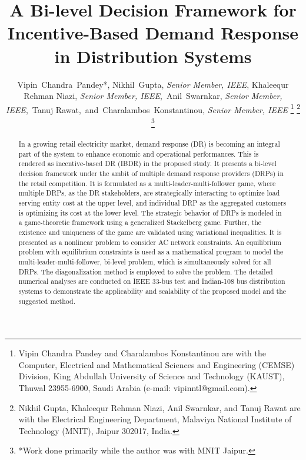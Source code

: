 \documentclass[journal]{IEEEtran}
\begin{document}
\title{A Bi-level Decision Framework for Incentive-Based Demand Response in Distribution Systems}
\author{Vipin~Chandra~Pandey*,
        Nikhil~Gupta, \emph{Senior Member, IEEE}, Khaleequr Rehman Niazi, \emph{Senior Member, IEEE},~Anil~Swarnkar, \emph{Senior Member, IEEE},~Tanuj Rawat,~and~Charalambos~Konstantinou, \emph{Senior Member, IEEE}
        \thanks{Vipin Chandra Pandey and Charalambos Konstantinou are with the Computer, Electrical and Mathematical Sciences and Engineering (CEMSE) Division, King Abdullah University of Science and Technology (KAUST), Thuwal 23955-6900, Saudi Arabia (e-mail: vipinntl@gmail.com).}
        \thanks{Nikhil Gupta, Khaleequr Rehman Niazi, Anil Swarnkar, and Tanuj Rawat are with the Electrical Engineering Department, Malaviya National Institute of Technology (MNIT), Jaipur 302017, India.}
        \thanks{*Work done primarily while the author was with MNIT Jaipur.}
        }%
\IEEEaftertitletext{\vspace{-2.5\baselineskip}}
\maketitle

\begin{abstract}
In a growing retail electricity market, demand response (DR) is becoming an integral part of the system to enhance economic and operational performances. This is rendered as incentive-based DR (IBDR) in the proposed study. It presents a bi-level decision framework under the ambit of multiple demand response providers (DRPs) in the retail competition. It is formulated as a multi-leader-multi-follower game, where multiple DRPs, as the DR stakeholders, are strategically interacting to optimize load serving entity cost at the upper level, and individual DRP as the aggregated customers is optimizing its cost at the lower level. The strategic behavior of DRPs is modeled in a game-theoretic framework using a generalized Stackelberg game. Further, the existence and uniqueness of the game are validated using variational inequalities. It is presented as a nonlinear problem to consider AC network constraints. An equilibrium problem with equilibrium constraints is used as a mathematical program to model the multi-leader-multi-follower, bi-level problem, which is simultaneously solved for all DRPs. The diagonalization method is employed to solve the problem. The detailed numerical analyses are conducted on IEEE 33-bus test and Indian-108 bus distribution systems to demonstrate the applicability and scalability of the proposed model and the suggested method.
\end{abstract}
\end{document}
